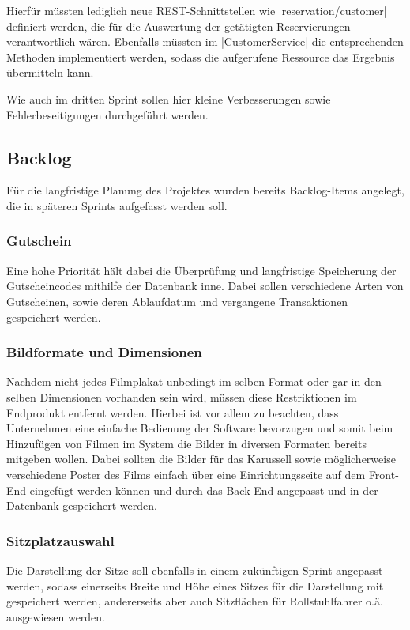 Hierfür müssten lediglich neue \acs{REST}-Schnittstellen wie \zb \jinline|reservation/customer| definiert werden, die für die Auswertung der getätigten Reservierungen verantwortlich wären.
Ebenfalls müssten im \jinline|CustomerService| die entsprechenden Methoden implementiert werden, sodass die aufgerufene Ressource das Ergebnis übermitteln kann.

Wie auch im dritten Sprint sollen hier kleine Verbesserungen sowie Fehlerbeseitigungen durchgeführt werden.

\subsection{Backlog}
\label{ssec:backlog}
\multipleauthorsection{\authorRF}{\authorEJ, \authorNL}
Für die langfristige Planung des Projektes wurden bereits Backlog-Items angelegt, die in späteren Sprints aufgefasst werden soll.

\subsubsection*{Gutschein}
\label{ssssec:gutschein}
Eine hohe Priorität hält dabei die Überprüfung und langfristige Speicherung der Gutscheincodes mithilfe der Datenbank inne.
Dabei sollen verschiedene Arten von Gutscheinen, sowie deren Ablaufdatum und vergangene Transaktionen gespeichert werden.

\subsubsection*{Bildformate und Dimensionen}
\label{ssssec:bildformatedimensionen}
Nachdem nicht jedes Filmplakat unbedingt im selben Format oder gar in den selben Dimensionen vorhanden sein wird, müssen diese Restriktionen im Endprodukt entfernt werden.
Hierbei ist vor allem zu beachten, dass Unternehmen eine einfache Bedienung der Software bevorzugen und somit beim Hinzufügen von Filmen im System die Bilder in diversen Formaten bereits mitgeben wollen.
Dabei sollten die Bilder für das Karussell sowie möglicherweise verschiedene Poster des Films einfach über eine Einrichtungsseite auf dem Front-End eingefügt werden können und durch das Back-End angepasst und in der Datenbank gespeichert werden.

\subsubsection*{Sitzplatzauswahl}
\label{ssssec:sitzplatzauswahl}
Die Darstellung der Sitze soll ebenfalls in einem zukünftigen Sprint angepasst werden, sodass einerseits Breite und Höhe eines Sitzes für die Darstellung mit gespeichert werden, andererseits aber auch Sitzflächen für Rollstuhlfahrer o.ä. ausgewiesen werden.

